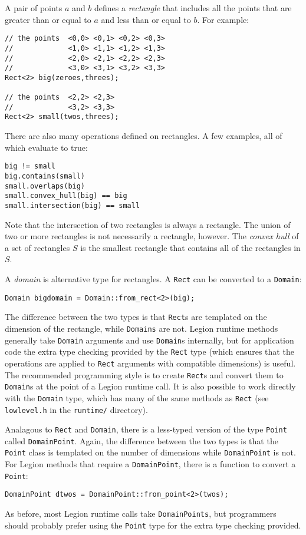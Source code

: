 A pair of points $a$ and $b$ defines a {\em rectangle} that includes all the points that are greater than or equal to $a$
and less than or equal to $b$.  For example:
\begin{verbatim}
// the points  <0,0> <0,1> <0,2> <0,3> 
//             <1,0> <1,1> <1,2> <1,3>
//             <2,0> <2,1> <2,2> <2,3>
//             <3,0> <3,1> <3,2> <3,3>
Rect<2> big(zeroes,threes);  

// the points  <2,2> <2,3>
//             <3,2> <3,3>
Rect<2> small(twos,threes);
\end{verbatim}
There are also many operations defined on rectangles.  A few examples, all of which evaluate to true:
\begin{verbatim}
big != small                       
big.contains(small)                
small.overlaps(big)                
small.convex_hull(big) == big      
small.intersection(big) == small   
\end{verbatim}
Note that the intersection of two rectangles is always a rectangle.  The union of two or more rectangles is not necessarily a 
rectangle, however. The {\em convex hull} of a set of rectangles $S$ is the smallest rectangle that contains all of the rectangles
in $S$.

A {\em domain} is alternative type for rectangles.  A {\tt Rect} can be converted to a {\tt Domain}:
\begin{verbatim}
Domain bigdomain = Domain::from_rect<2>(big);
\end{verbatim}
The difference between the two types is that {\tt Rect}s are templated on the dimension of the rectangle, while {\tt Domains}
are not.  Legion runtime methods generally take {\tt Domain} arguments and use {\tt Domain}s internally, but for application
code the extra type checking provided by the {\tt Rect} type (which ensures that the operations are applied to {\tt Rect} arguments
with compatible dimensions) is useful.  The recommended programming style is to create {\tt Rect}s and convert them to {\tt Domain}s
at the point of a Legion runtime call.  It is also possible to work directly with the {\tt Domain} type, which has many
of the same methods as {\tt Rect} (see {\tt lowlevel.h} in the {\tt runtime/} directory).

Analagous to {\tt Rect} and {\tt Domain}, there is a less-typed version of the type {\tt Point} called {\tt DomainPoint}.
Again, the difference between the two types is that the {\tt Point} class is templated on the number of dimensions 
while {\tt DomainPoint} is not.  For Legion methods that require a {\tt DomainPoint}, there is a function to convert a
{\tt Point}:
\begin{verbatim}
DomainPoint dtwos = DomainPoint::from_point<2>(twos);
\end{verbatim}
As before, most Legion runtime calls take {\tt DomainPoints}, but programmers should probably prefer using the {\tt Point} type
for the extra type checking provided.

